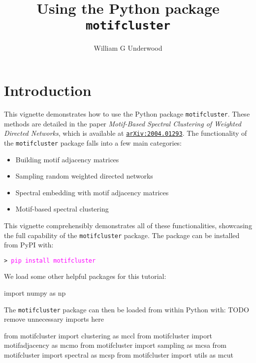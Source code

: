 \documentclass{article}
\title{Using the Python package \texttt{motifcluster}}
\author{William G Underwood}
\begin{document}
\maketitle
\tableofcontents

\pagebreak

\section{Introduction}

This vignette demonstrates how to use the Python package \texttt{motifcluster}.
These methods are detailed in the paper
\textit{Motif-Based Spectral Clustering of Weighted Directed Networks},
which is available at
\href{https://arxiv.org/abs/2004.01293}{\texttt{arXiv:2004.01293}}.
The functionality of the \texttt{motifcluster} package falls into a few main
categories:

\begin{itemize}
\item Building motif adjacency matrices
\item Sampling random weighted directed networks
\item Spectral embedding with motif adjacency matrices
\item Motif-based spectral clustering
\end{itemize}

This vignette comprehensibly demonstrates all of these functionalities,
showcasing the full capability of the \texttt{motifcluster} package. The package
can be installed from PyPI with:

\vspace*{2mm}
\texttt{> \textcolor{Fuchsia}{pip install motifcluster}}
\vspace*{3mm}

We load some other helpful packages for this tutorial:
\begin{pyconsole}
import numpy as np
\end{pyconsole}

The \texttt{motifcluster} package can then be loaded
from within Python with: TODO remove unnecessary imports here

\begin{pyconsole}
from motifcluster import clustering as mccl
from motifcluster import motifadjacency as mcmo
from motifcluster import sampling as mcsa
from motifcluster import spectral as mcsp
from motifcluster import utils as mcut
\end{pyconsole}
\end{document}
